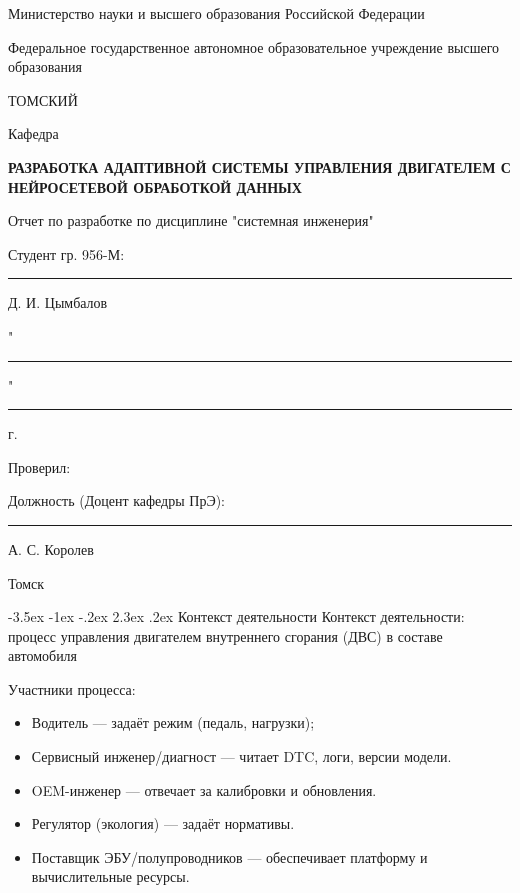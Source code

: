 \documentclass[14pt, a4paper]{extarticle}
\makeatletter
\renewcommand\section{\clearpage\@startsection{section}{1}{1.25cm}%
	{-3.5ex \@plus -1ex \@minus -.2ex}%
	{2.3ex \@plus.2ex}%
	{%
		\bfseries
		\fontsize{16}{1.5}\selectfont
}}
\makeatother
\begin{document}
	\begin{titlepage}
		\centering
		Министерство науки и высшего образования Российской Федерации
		
		Федеральное государственное автономное образовательное учреждение высшего образования
		
		\MakeUppercase{Томский}
		
		\vspace{1\baselineskip}
		
		Кафедра
		
		\vspace{2\baselineskip}
		
		{\bfseries\MakeUppercase{
			Разработка адаптивной системы управления двигателем с нейросетевой обработкой данных
		}}
		
		Отчет по разработке по дисциплине "системная инженерия"
		
		\vspace{1\baselineskip}
		
		\begin{flushright}
			Студент гр. 956-М:
			
			{\rule{1.5cm}{0.4pt} Д. И. Цымбалов}
			
			"\rule{1.5cm}{0.4pt}" \rule{2cm}{0.4pt} {\the\year}г.
			
			\vspace*{1\baselineskip}
			
			Проверил:
			
			Должность (Доцент кафедры ПрЭ):
			
			{\rule{1.5cm}{0.4pt} А. С. Королев}
			
		\end{flushright}
		
		\vfill
		{Томск \the\year}
		
	\end{titlepage}
	
	\section{Контекст деятельности}
		Контекст деятельности: процесс управления двигателем внутреннего сгорания (ДВС) в составе автомобиля
		
		Участники процесса:
		
		\begin{itemize}
			\item Водитель — задаёт режим (педаль, нагрузки);
			\item Сервисный инженер/диагност — читает DTC, логи, версии модели.
			\item OEM-инженер — отвечает за калибровки и обновления.
			\item Регулятор (экология) — задаёт нормативы.
			\item Поставщик ЭБУ/полупроводников — обеспечивает платформу и вычислительные ресурсы.
		\end{itemize}
	
\end{document}
